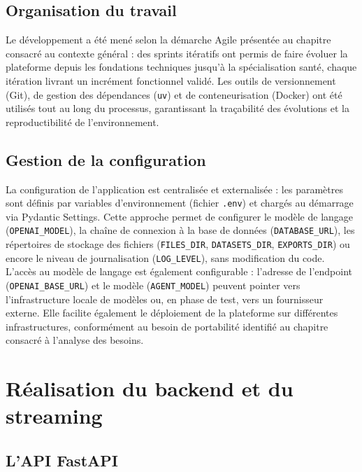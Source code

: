 \subsection{Organisation du travail}

Le développement a été mené selon la démarche Agile présentée au chapitre consacré au contexte général : des sprints itératifs ont permis de faire évoluer la plateforme depuis les fondations techniques jusqu'à la spécialisation santé, chaque itération livrant un incrément fonctionnel validé. Les outils de versionnement (Git), de gestion des dépendances (\texttt{uv}) et de conteneurisation (Docker) ont été utilisés tout au long du processus, garantissant la traçabilité des évolutions et la reproductibilité de l'environnement.

\subsection{Gestion de la configuration}

La configuration de l'application est centralisée et externalisée : les paramètres sont définis par variables d'environnement (fichier \texttt{.env}) et chargés au démarrage via Pydantic Settings. Cette approche permet de configurer le modèle de langage (\texttt{OPENAI\_MODEL}), la chaîne de connexion à la base de données (\texttt{DATABASE\_URL}), les répertoires de stockage des fichiers (\texttt{FILES\_DIR}, \texttt{DATASETS\_DIR}, \texttt{EXPORTS\_DIR}) ou encore le niveau de journalisation (\texttt{LOG\_LEVEL}), sans modification du code. L'accès au modèle de langage est également configurable : l'adresse de l'endpoint (\texttt{OPENAI\_BASE\_URL}) et le modèle (\texttt{AGENT\_MODEL}) peuvent pointer vers l'infrastructure locale de modèles ou, en phase de test, vers un fournisseur externe. Elle facilite également le déploiement de la plateforme sur différentes infrastructures, conformément au besoin de portabilité identifié au chapitre consacré à l'analyse des besoins.

\section{Réalisation du backend et du streaming}

\subsection{L'API FastAPI}

